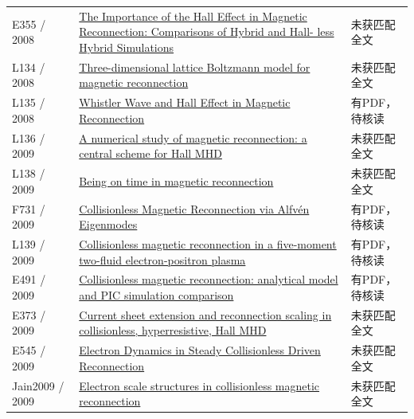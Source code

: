 \documentclass[UTF8,a4paper,11pt,openany,fontset=fandol]{ctexbook}
\begin{document}
\begin{longtable}{P{24mm}P{97mm}P{27mm}}
E355 / 2008 & \href{http://ui.adsabs.harvard.edu/abs/2008AGUSMSM24A..07M/abstract}{The Importance of the Hall Effect in Magnetic Reconnection: Comparisons of Hybrid and Hall- less Hybrid Simulations} & 未获匹配全文\\

L134 / 2008 & \href{https://doi.org/10.1103/physreve.77.026713}{Three-dimensional lattice Boltzmann model for magnetic reconnection} & 未获匹配全文\\

L135 / 2008 & \href{https://doi.org/10.11728/cjss2008.02.114}{Whistler Wave and Hall Effect in Magnetic Reconnection} & 有PDF，待核读\\

L136 / 2009 & \href{https://doi.org/10.1090/psapm/067.2/2605283}{A numerical study of magnetic reconnection: a central scheme for Hall MHD} & 未获匹配全文\\

L138 / 2009 & \href{https://doi.org/10.1088/1367-2630/11/6/063008}{Being on time in magnetic reconnection} & 未获匹配全文\\

F731 / 2009 & \href{https://doi.org/10.1103/physrevlett.102.245003}{Collisionless Magnetic Reconnection via Alfvén Eigenmodes} & 有PDF，待核读\\

L139 / 2009 & \href{https://doi.org/10.1090/psapm/067.2/2605264}{Collisionless magnetic reconnection in a five-moment two-fluid electron-positron plasma} & 有PDF，待核读\\

E491 / 2009 & \href{https://doi.org/10.5194/angeo-27-905-2009}{Collisionless magnetic reconnection: analytical model and PIC simulation comparison} & 有PDF，待核读\\

E373 / 2009 & \href{http://absimage.aps.org/image/DPP09/MWS_DPP09-2009-001646.pdf}{Current sheet extension and reconnection scaling in collisionless,  hyperresistive,  Hall MHD} & 未获匹配全文\\

E545 / 2009 & \href{http://id.nii.ac.jp/1013/00001414/}{Electron Dynamics in Steady Collisionless Driven Reconnection} & 未获匹配全文\\

Jain2009 / 2009 & \href{https://doi.org/10.1063/1.3134045}{Electron scale structures in collisionless magnetic reconnection} & 未获匹配全文\\


\end{longtable}
\end{document}
